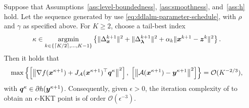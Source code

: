 \begin{theorem}
\label{thm:main}
Suppose that Assumptions~\ref{ass:level-boundedness},
\ref{ass:smoothness}, and~\ref{ass:h} hold.
Let the sequence generated by  use
\eqref{eq:ddlalm-parameter-schedule}, with $\rho$ and $\gamma$ as specified
above. For $K\ge2$, choose a tail-best index
\[
    \kappa\in\operatorname*{\mathrm{argmin}}_{k\in\{\lceil K/2\rceil,\ldots,K-1\}}
    \left\{
        \|\Delta_{\bm{x}}^{k+1}\|^2
        +\|\Delta_{\bm{\lambda}}^{k+1}\|^2
        +\alpha_k\|\bm{x}^{k+1}-\bm{z}^k\|^2
    \right\}.
\]
Then it holds that
\[
\max\left\{
\left[
    \left\|
        \nabla f({\bm{x}}^{\kappa+1})
        +
        J_{\cal A}({\bm{x}}^{\kappa+1})^\top{\bm{q}}^{\kappa}
    \right\|^2
\right],
\;
\left[
    \left\|
        {\cal A}({\bm{x}}^{\kappa+1})-{\bm{y}}^{\kappa+1}
    \right\|^2
\right]
\right\}
=
\mathcal O(K^{-2/3}),
\]
with \({\bm{q}}^{\kappa}\in\partial h({\bm{y}}^{\kappa+1})\).
Consequently, given \(\epsilon>0\), the iteration complexity of
 to obtain an \(\epsilon\)-KKT point
is of order \(\mathcal O(\epsilon^{-3})\).
\end{theorem}
